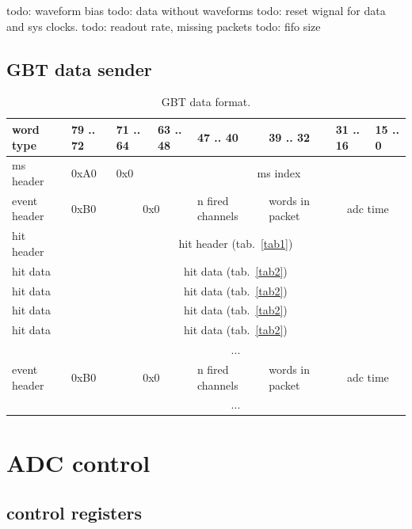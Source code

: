 \documentclass{article}
\begin{document}
todo: waveform bias
todo: data without waveforms
todo: reset wignal for data and sys clocks.
todo: readout rate, missing packets
todo: fifo size


\subsection{GBT data sender}



\begin{table}[H]
\centering
\begin{tabular}{| l | l | l | l | l | l | l | l |}
\hline
word type & 79 .. 72 & 71 .. 64 & 63 .. 48 & 47 .. 40 & 39 .. 32 & 31 .. 16 & 15 .. 0 \\ \hline
ms header & 0xA0 & 0x0  & \multicolumn{5}{c|}{ms index} \\ \hline
event header & 0xB0 & \multicolumn{2}{c|}{0x0} & n fired channels & words in packet & \multicolumn{2}{c|}{adc time} \\ \hline
hit header & \multicolumn{7}{c|}{hit header (tab.~\ref{tab1})} \\ \hline
hit data & \multicolumn{7}{c|}{hit data (tab.~\ref{tab2})} \\ \hline
hit data & \multicolumn{7}{c|}{hit data (tab.~\ref{tab2})} \\ \hline
hit data & \multicolumn{7}{c|}{hit data (tab.~\ref{tab2})} \\ \hline
hit data & \multicolumn{7}{c|}{hit data (tab.~\ref{tab2})} \\ \hline
  & \multicolumn{7}{c|}{ ... } \\ \hline

event header & 0xB0 & \multicolumn{2}{c|}{0x0} & n fired channels & words in packet & \multicolumn{2}{c|}{adc time} \\ \hline
  & \multicolumn{7}{c|}{ ... } \\ \hline

\end{tabular}
\caption{GBT data format.\label{tab6}}
\end{table}




\section{ADC control}
\subsection{control registers}
\end{document}
